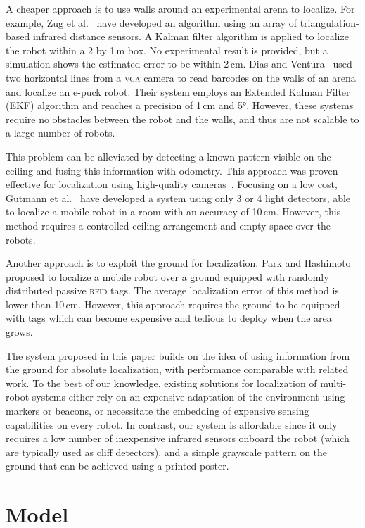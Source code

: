 \documentclass{svmult}
\begin{document}
A cheaper approach is to use walls around an experimental arena to localize.
For example, Zug et al.~\cite{zug2011design} have developed an algorithm using an array of triangulation-based infrared distance sensors.
A Kalman filter algorithm is applied to localize the robot within a 2 by 1\,m box.
No experimental result is provided, but a simulation shows the estimated error to be within 2\,cm.
Dias and Ventura~\cite{dias2013absolute} used two horizontal lines from a \textsc{vga} camera to read barcodes on the walls of an arena and localize an e-puck robot.
Their system employs an Extended Kalman Filter (EKF) algorithm and reaches a precision of 1\,cm and 5°.
However, these systems require no obstacles between the robot and the walls, and thus are not scalable to a large number of robots.

This problem can be alleviated by detecting a known pattern visible on the ceiling and fusing this information with odometry.
This approach was proven effective for localization using high-quality cameras~\cite{dellaert1999monte}.
Focusing on a low cost, Gutmann et al.~\cite{gutmann2013challenges} have developed a system using only 3 or 4 light detectors, able to localize a mobile robot in a room with an accuracy of 10\,cm.
However, this method requires a controlled ceiling arrangement and empty space over the robots.

Another approach is to exploit the ground for localization.
Park and Hashimoto~\cite{park2009approach} proposed to localize a mobile robot over a ground equipped with randomly distributed passive \textsc{rfid} tags.
The average localization error of this method is lower than 10\,cm.
However, this approach requires the ground to be equipped with tags which can become expensive and tedious to deploy when the area grows.

The system proposed in this paper builds on the idea of using information from the ground for absolute localization, with performance comparable with related work.
To the best of our knowledge, existing solutions for localization of multi-robot systems either rely on an expensive adaptation of the environment using markers or beacons, or necessitate the embedding of expensive sensing capabilities on every robot.
In contrast, our system is affordable since it only requires a low number of inexpensive infrared sensors onboard the robot (which are typically used as cliff detectors), and a simple grayscale pattern on the ground that can be achieved using a printed poster.

\section{Model}
\end{document}
